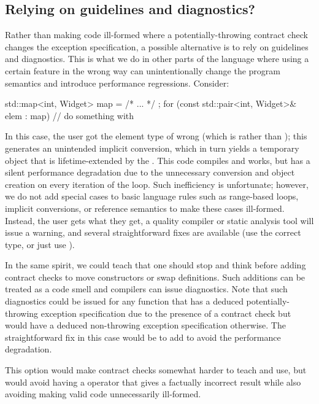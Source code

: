 \subsection{Relying on guidelines and diagnostics?}

Rather than making code ill-formed where a potentially-throwing contract check changes the exception specification, a possible alternative is to rely on guidelines and diagnostics. This is what we do in other parts of the language where using a certain feature in the wrong way can unintentionally change the program semantics and introduce performance regressions. Consider:

\begin{codeblock}
std::map<int, Widget> map = { /* ... */ };
for (const std::pair<int, Widget>& elem : map)
  // do something with 
\end{codeblock}

In this case, the user got the element type of  wrong (which is  rather than ); this generates an unintended implicit conversion, which in turn yields a temporary object that is lifetime-extended by the . This code compiles and works, but has a silent performance degradation due to the unnecessary conversion and object creation on every iteration of the loop. Such inefficiency is unfortunate; however, we do not add special cases to basic language rules such as range-based  loops, implicit conversions, or reference semantics to make these cases ill-formed. Instead, the user gets what they get, a quality compiler or static analysis tool will issue a warning, and several straightforward fixes are available (use the correct type, or just use ).

In the same spirit, we could teach that one should stop and think before adding contract checks to move constructors or swap definitions. Such additions can be treated as a code smell and compilers can issue diagnostics. Note that such diagnostics could be issued for any function that has a deduced potentially-throwing exception specification due to the presence of a contract check but would have a deduced non-throwing exception specification otherwise. The straightforward fix in this case would be to add  to avoid the performance degradation.

This option would make contract checks somewhat harder to teach and use, but would avoid having a  operator that gives a factually incorrect result while also avoiding making valid code unnecessarily ill-formed.

